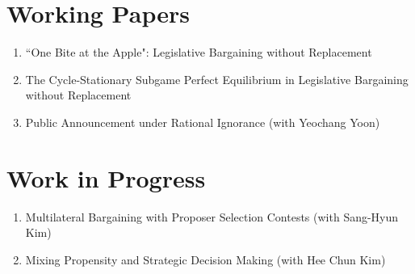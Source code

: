 \documentclass[margin]{res}
\begin{document}
\begin{resume}

\section{Working Papers}
\begin{enumerate}
\item ``One Bite at the Apple": Legislative Bargaining without Replacement
\item The Cycle-Stationary Subgame Perfect Equilibrium in Legislative Bargaining without Replacement
\item Public Announcement under Rational Ignorance (with Yeochang Yoon)
\end{enumerate}

\section{Work in Progress}
\begin{enumerate}
\item Multilateral Bargaining with Proposer Selection Contests (with Sang-Hyun Kim)
\item Mixing Propensity and Strategic Decision Making (with Hee Chun Kim)
\end{enumerate}


\end{resume}
\end{document}
